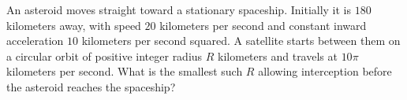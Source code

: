 An asteroid moves straight toward a stationary spaceship. Initially it is $180$ kilometers away, with speed $20$ kilometers per second and constant inward acceleration $10$ kilometers per second squared. A satellite starts between them on a circular orbit of positive integer radius $R$ kilometers and travels at $10\pi$ kilometers per second. What is the smallest such $R$ allowing interception before the asteroid reaches the spaceship?
